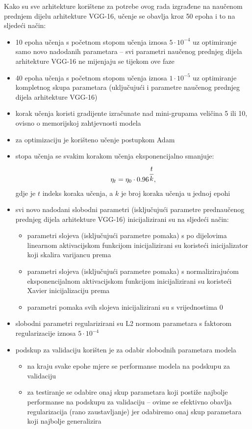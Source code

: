 \documentclass[times, utf8, diplomski, numeric]{fer}
\begin{document}
Kako su sve arhitekture korištene za potrebe ovog rada izgrađene na naučenom prednjem dijelu arhitekture VGG-16, učenje se obavlja kroz 50 epoha i to na sljedeći način:
\begin{itemize}
 \item 10 epoha učenja s početnom stopom učenja iznosa $5\cdot10^{-4}$ uz optimiranje samo novo nadodanih parametara -- svi parametri naučenog prednjeg dijela arhitekture VGG-16 ne mijenjaju se tijekom ove faze
 \item 40 epoha učenja s početnom stopom učenja iznosa $1\cdot10^{-5}$ uz optimiranje kompletnog skupa parametara (uključujući i parametre naučenog prednjeg dijela arhitekture VGG-16)
 \item korak učenja koristi gradijente izračunate nad mini-grupama veličina 5 ili 10, ovisno o memorijskoj zahtjevnosti modela
 \item za optimizaciju je korišteno učenje postupkom Adam
 \item stopa učenja se svakim korakom učenja eksponencijalno smanjuje:
 \begin{align}
  \eta_{t}=\eta_0 \cdot 0.96^{\cfrac{t}{k}},
 \end{align}
gdje je $t$ indeks koraka učenja, a $k$ je broj koraka učenja u jednoj epohi
 \item svi novo nadodani slobodni parametri (isključujući parametre prednaučenog prednjeg dijela arhitekture VGG-16) inicijalizirani su na sljedeći način:
 \begin{itemize}
  \item parametri slojeva (isključujući parametre pomaka) s po dijelovima linearnom aktivacijskom funkcijom inicijalizirani su koristeći inicijalizator koji skalira varijancu prema \citep{article:delving_deep_into_rectifiers}
  \item parametri slojeva (isključujući parametre pomaka) s normalizirajućom eksponencijalnom aktivacijskom funkcijom inicijalizirani su koristeći Xavier inicijalizaciju prema \citep{article:delving_deep_into_rectifiers}
  \item parametri pomaka svih slojeva inicijalizirani su s vrijednostima 0
 \end{itemize}

 \item slobodni parametri regularizirani su L2 normom parametara s faktorom regularizacije iznosa $5\cdot10^{-4}$
 \item podskup za validaciju korišten je za odabir slobodnih parametara modela
 \begin{itemize}
  \item na kraju svake epohe mjere se performanse modela na podskupu za validaciju
  \item za testiranje se odabire onaj skup parametara koji postiže najbolje performanse na podskupu za validaciju -- ovime se efektivno obavlja regularizacija (rano zaustavljanje) jer odabiremo onaj skup parametara koji najbolje generalizira
 \end{itemize}
\end{itemize}
\end{document}
